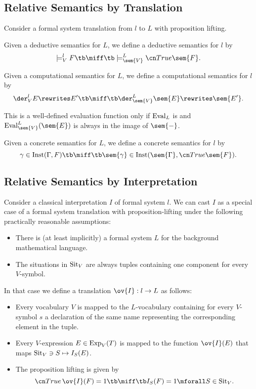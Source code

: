 \subsection{Relative Semantics by Translation}

Consider a formal system translation from $l$ to $L$ with proposition lifting.

\begin{definition}
Given a deductive semantics for $L$, we define a deductive semantics for $l$ by
\[\models^l_V F \tb\miff\tb \models^L_{\sem{V}}\truelift\sem{F}.\]
\end{definition}

\begin{definition}
Given a computational semantics for $L$, we define a computational semantics for $l$ by
\[\der^l_V E\rewrites E' \tb\miff\tb \der^L_{\sem{V}} \sem{E}\rewrites \sem{E'}.\]

This is a well-defined evaluation function only if $\mathrm{Eval}_L$ is and $\Eval^L_{\sem{V}}(\sem{E})$ is always in the image of $\sem{-}$.
\end{definition}

\begin{definition}
Given a concrete semantics for $L$, we define a concrete semantics for $l$ by
\[\gamma\in \Inst(\Gamma,F) \tb\miff\tb \sem{\gamma}\in\Inst(\sem{\Gamma},\truelift\sem{F}).\]
\end{definition}

\subsection{Relative Semantics by Interpretation}

Consider a classical interpretation $I$ of formal system $l$.
We can cast $I$ as a special case of a formal system translation with proposition-lifting under the following practically reasonable assumptions:
\begin{itemize}
\item There is (at least implicitly) a formal system $L$ for the background mathematical language.
\item The situations in $\mathrm{Sit}_V$ are always tuples containing one component for every $V$-symbol.
\end{itemize}

In that case we define a translation $\ov{I}:l\to L$ as follows:
\begin{itemize}
\item Every vocabulary $V$ is mapped to the $L$-vocabulary containing for every $V$-symbol $s$ a declaration of the same name representing the corresponding element in the tuple.
\item Every $V$-expression $E\in\mathrm{Exp}_V(T)$ is mapped to the function $\ov{I}(E)$ that maps $\mathrm{Sit}_V\ni S \mapsto I_S(E)$.
\item The proposition lifting is given by \[\truelift\, \ov{I}(F) = 1 \tb\miff \tb I_S(F)=1 \mforall S\in\Sit_V.\]
\end{itemize}

